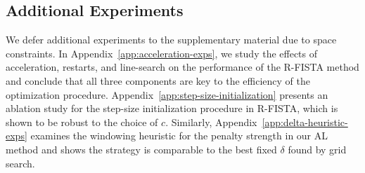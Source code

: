 \subsection{Additional Experiments}\label{sec:additional-experiments}

We defer additional experiments to the supplementary material due to space constraints.
In Appendix~\ref{app:acceleration-exps}, we study the effects of acceleration, restarts, and line-search on the performance of the R-FISTA method and conclude that all three components are key to the efficiency of the optimization procedure.
Appendix~\ref{app:step-size-initialization} presents an ablation study for the step-size initialization procedure in R-FISTA, which is shown to be robust to the choice of \( c \).
Similarly, Appendix~\ref{app:delta-heuristic-exps} examines the windowing heuristic for the penalty strength in our AL method and shows the strategy is comparable to the best fixed \( \delta \) found by grid search.

